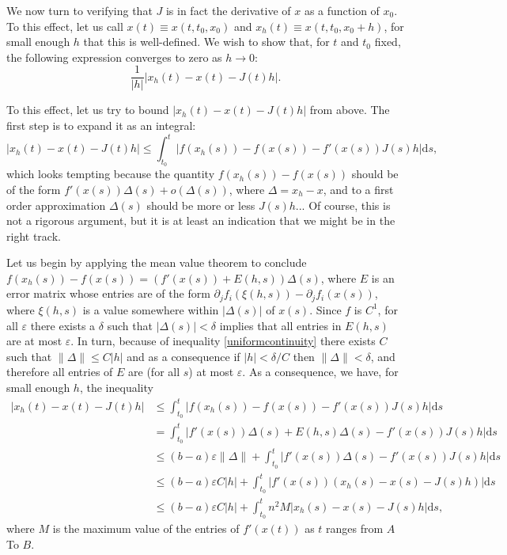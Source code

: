 \documentclass{article}
\newcommand{\dd}{\mathrm{d}}
\begin{document}
We now turn to verifying that $J$ is in fact the derivative of $x$ as a function of $x_0$. To this effect, let us call $x(t) \equiv x(t,t_0,x_0)$ and $x_h(t) \equiv x(t,t_0,x_0+h)$, for small enough $h$ that this is well-defined. We wish to show that, for $t$ and $t_0$ fixed, the following expression converges to zero as $h \to 0$:
\[\frac1{\lvert h \rvert} \left\lvert x_h(t) - x(t) - J(t) h \right\rvert.\]

To this effect, let us try to bound $\left\lvert x_h(t) - x(t) - J(t) h \right\rvert$ from above. The first step is to expand it as an integral:
\[\left\lvert x_h(t) - x(t) - J(t) h \right\rvert \leq \int_{t_0}^t \lvert f(x_h(s)) - f(x(s)) - f'(x(s)) J(s) h \rvert \dd s,\]
which looks tempting because the quantity $f(x_h(s)) - f(x(s))$ should be of the form $f'(x(s)) \Delta(s) + o(\Delta(s))$, where $\Delta = x_h - x$, and to a first order approximation $\Delta(s)$ should be more or less $J(s)h$... Of course, this is not a rigorous argument, but it is at least an indication that we might be in the right track.

Let us begin by applying the mean value theorem to conclude $f(x_h(s)) - f(x(s)) = (f'(x(s)) + E(h,s)) \Delta(s)$, where $E$ is an error matrix whose entries are of the form $\partial_j f_i(\xi(h,s)) - \partial_j f_i(x(s))$, where $\xi(h,s)$ is a value somewhere within $\lvert \Delta(s) \rvert$ of $x(s)$. Since $f$ is $C^1$, for all $\varepsilon$ there exists a $\delta$ such that $\lvert \Delta(s) \rvert < \delta$ implies that all entries in $E(h,s)$ are at most $\varepsilon$. In turn, because of inequality \eqref{uniformcontinuity} there exists $C$ such that $\lVert \Delta \rVert \leq C \lvert h \rvert$ and as a consequence if $\lvert h \rvert < \delta/C$ then $\lVert \Delta \rVert < \delta$, and therefore all entries of $E$ are (for all $s$) at most $\varepsilon$. As a consequence, we have, for small enough $h$, the inequality
\begin{align*}
\left\lvert x_h(t) - x(t) - J(t) h \right\rvert &\leq \int_{t_0}^t \lvert f(x_h(s)) - f(x(s)) - f'(x(s)) J(s) h \rvert \dd s\\
&= \int_{t_0}^t \lvert f'(x(s)) \Delta(s) + E(h,s) \Delta(s) - f'(x(s)) J(s) h \rvert \dd s\\
&\leq (b-a) \varepsilon \lVert \Delta \rVert + \int_{t_0}^t \lvert f'(x(s)) \Delta(s) - f'(x(s)) J(s) h \rvert \dd s\\
&\leq (b-a) \varepsilon C \lvert h \rvert + \int_{t_0}^t \lvert f'(x(s)) (x_h(s) - x(s) - J(s) h) \rvert \dd s\\
&\leq (b-a) \varepsilon C \lvert h \rvert + \int_{t_0}^t n^2 M \lvert x_h(s) - x(s) - J(s) h \rvert \dd s,
\end{align*}
where $M$ is the maximum value of the entries of $f'(x(t))$ as $t$ ranges from $A$ To $B$.
\end{document}
